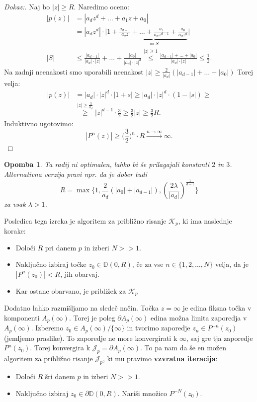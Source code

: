 \documentclass{article}
\newtheorem{opomba}{Opomba}
\newcommand{\D}{\mathbb{D}}
\begin{document}
\begin{proof}[Dokaz:]
Naj bo $|z| \geq R$. Naredimo oceno: 
\begin{align*}
|p(z)| &= |a_d z^d + \dots + a_1 z + a_0| \\
&= |a_d z^d| \cdot \Big|1 + \underbrace{\frac{a_{d-1}}{a_d z} + \dots + \frac{a_1}{a_d z^{d-1}} + \frac{a_0}{a_d z^d}}_{\eqqcolon S}\Big| \\[1mm]
|S| &\leq \frac{|a_{d-1}|}{|a_d|\cdot |z|} + \dots + \frac{|a_0|}{|a_d|\cdot |z|^d} \stackrel{|z| \geq 1}{\leq} \frac{|a_{d-1}| + \dots + |a_0|}{|a_d| \cdot |z|} \leq \frac{1}{2}.
\end{align*}
Na zadnji neenakosti smo uporabili neenakost $|z| \geq \frac{2}{|a_d|}(|a_{d-1}| + \dots + |a_0|)$
Torej velja:
\begin{align*}
|p(z)| &= |a_d| \cdot |z|^d \cdot |1 + s| \geq |a_d|\cdot |z|^d \cdot (1 - |s|) \geq\\
&\stackrel{|z| \geq \frac{3}{a_d}}{\geq} |z|^{d-1} \cdot\frac{3}{2} 
\geq \frac{3}{2} |z| \geq \frac{3}{2} R.
\end{align*}
Induktivno ugotovimo:
$$
|P^n(z)| \geq \Big(\frac{3}{2} \Big)^n \cdot R \xrightarrow{n\rightarrow \infty} \infty.
$$
\end{proof}

\begin{opomba}
Ta radij ni optimalen, lahko bi še prilagajali konstanti $2$ in $3$. 
Alternativna verzija pravi npr. da je dober tudi 
$$
R = \max\Big\{1, \frac{2}{a_d}(|a_0| + |a_{d-1}|), \left(\frac{2\lambda}{|a_d|}\right)^{\frac{1}{d-1}} \Big\}
$$
za vsak $\lambda > 1$.
\end{opomba}

Posledica tega izreka je algoritem za približno risanje $\mathcal{K}_p$, ki 
ima naslednje korake:
\begin{itemize}
    \item Določi $R$ pri danem $p$ in izberi $N>> 1$.
    \item Naključno izbiraj točke $z_0 \in \D(0, R)$, če za vse $n\in \{1, 2, \dots, N\}$
    velja, da je $|P^n(z_0)| < R$, jih obarvaj.
    \item Kar ostane obarvano, je približek za $\mathcal{K}_p$
\end{itemize}

Dodatno lahko razmišljamo na sledeč način. Točka $z = \infty$ je edina 
fiksna točka v komponenti $A_p(\infty)$. Torej je poleg $\partial A_p(\infty)$
edina možna limita zaporedja v $A_p(\infty).$ Izberemo $z_0 \in A_p(\infty) \slash \{\infty\}$
in tvorimo zaporedje $z_n \in P^{-n}(z_0)$ (jemljemo praslike). To zaporedje 
ne more konvergirati k $\infty$, saj gre tja zaporedje $P^n(z_0)$. Torej 
konvergira k $\mathcal{J}_p = \partial A_p(\infty)$. To pa nam da še en 
možen algoritem za približno risanje $\mathcal{J}_p$, ki mu pravimo \textbf{vzvratna iteracija}: 
\begin{itemize}
    \item Določi $R$ šri danem $p$ in izberi $N >> 1$. 
    \item Naključno izbiraj $z_0 \in \partial \D(0, R)$. Nariši množico 
    $P^{-N}(z_0)$. 
\end{itemize}
\end{document}
